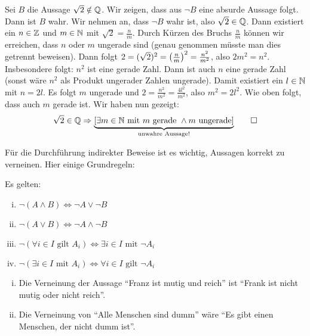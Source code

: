 \begin{beweis}
	Sei $B$ die Aussage $\sqrt{2} \notin \mathbb{Q}$.
	Wir zeigen, dass aus $\neg B$ eine absurde Aussage folgt.
	Dann ist $B$ wahr.
	Wir nehmen an, dass $\neg B$ wahr ist, also $\sqrt{2} \in \mathbb{Q}$.
	Dann existiert ein $n \in \mathbb{Z}$ und $m \in \mathbb{N}$ mit $\sqrt{2} = \frac{n}{m}$.
	Durch Kürzen des Bruchs $\frac{n}{m}$ können wir erreichen, dass $n$ oder $m$ ungerade sind (genau genommen müsste man dies getrennt beweisen).
	Dann folgt $2 = (\sqrt{2})^2 = \left(\frac{n}{m}\right)^2 = \frac{n^2}{m^2}$, also $2m^2 = n^2$.
	Insbesondere folgt: $n^2$ ist eine gerade Zahl.
	Dann ist auch $n$ eine gerade Zahl (sonst wäre $n^2$ als Produkt ungerader Zahlen ungerade).
	Damit existiert ein $l \in \mathbb{N}$ mit $n = 2l$.
	Es folgt $m$ ungerade und $2 = \frac{n^2}{m^2} = \frac{4l^2}{m^2}$, also $m^2 = 2l^2$.
	Wie oben folgt, dass auch $m$ gerade ist.
	Wir haben nun gezeigt:
	\[
		\sqrt{2} \in \mathbb{Q} \Rightarrow {\underbrace{[\exists m \in \mathbb{N}\text{ mit } m \text{ gerade } \wedge m \text{ ungerade}]}_{\text{unwahre Aussage!}}} \qedhere
	\]
\end{beweis}

Für die Durchführung indirekter Beweise ist es wichtig, Aussagen korrekt zu verneinen.
Hier einige Grundregeln:

\begin{lemma}
	\label{lemma:I.1.6}
	Es gelten:
	\begin{enumerate}[(i)]
		\item $\neg(A \wedge B) \Leftrightarrow \neg A \vee \neg B$
		\item $\neg(A \vee B) \Leftrightarrow \neg A \wedge \neg B$
		\item $\neg(\forall i \in I \text{ gilt } A_i) \Leftrightarrow \exists i \in I \text{ mit } \neg A_i$
		\item $\neg(\exists i \in I \text{ mit } A_i) \Leftrightarrow \forall i \in I \text{ gilt } \neg A_i$
	\end{enumerate}
\end{lemma}

\begin{beispiel}
	\label{bsp:I.1.7}
	\begin{enumerate}[(i)]
		\item Die Verneinung der Aussage \enquote{Franz ist mutig und reich} ist \enquote{Frank ist nicht mutig oder nicht reich}.
		\item Die Verneinung von \enquote{Alle Menschen sind dumm} wäre \enquote{Es gibt einen Menschen, der nicht dumm ist}.
	\end{enumerate}
\end{beispiel}

